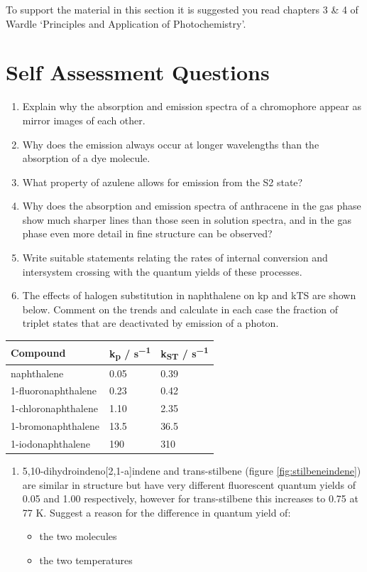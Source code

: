 \documentclass[
]{book}
\providecommand{\tightlist}{%
  \setlength{\itemsep}{0pt}\setlength{\parskip}{0pt}}
\begin{document}
To support the material in this section it is suggested you read chapters 3 \& 4 of Wardle `Principles and Application of Photochemistry'.

\hypertarget{sec:SSQemission}{%
\section{Self Assessment Questions}\label{sec:SSQemission}}

\begin{enumerate}
\def\labelenumi{\arabic{enumi}.}
\item
  Explain why the absorption and emission spectra of a chromophore appear as mirror images of each other.
\item
  Why does the emission always occur at longer wavelengths than the absorption of a dye molecule.
\item
  What property of azulene allows for emission from the S2 state?
\item
  Why does the absorption and emission spectra of anthracene in the gas phase show much sharper lines than those seen in solution spectra, and in the gas phase even more detail in fine structure can be observed?
\item
  Write suitable statements relating the rates of internal conversion and intersystem crossing with the quantum yields of these processes.
\item
  The effects of halogen substitution in naphthalene on kp and kTS are shown below. Comment on the trends and calculate in each case the fraction of triplet states that are deactivated by emission of a photon.
\end{enumerate}

\begin{longtable}[]{@{}lll@{}}
\toprule
Compound & k\textsubscript{p} / s\textsuperscript{−1} & k\textsubscript{ST} / s\textsuperscript{−1} \\
\midrule
\endhead
naphthalene & 0.05 & 0.39 \\
1-fluoronaphthalene & 0.23 & 0.42 \\
1-chloronaphthalene & 1.10 & 2.35 \\
1-bromonaphthalene & 13.5 & 36.5 \\
1-iodonaphthalene & 190 & 310 \\
\bottomrule
\end{longtable}

\begin{enumerate}
\def\labelenumi{\arabic{enumi}.}
\setcounter{enumi}{6}
\tightlist
\item
  5,10-dihydroindeno{[}2,1-a{]}indene and trans-stilbene (figure \ref{fig:stilbeneindene}) are similar in structure but have very different fluorescent quantum yields of 0.05 and 1.00 respectively, however for trans-stilbene this increases to 0.75 at 77 K. Suggest a reason for the difference in quantum yield of:

  \begin{itemize}
  \tightlist
  \item
    the two molecules
  \item
    the two temperatures
  \end{itemize}
\end{enumerate}
\end{document}
